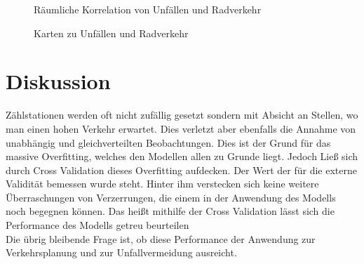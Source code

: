 \documentclass[a4paper,12pt]{thesis}
\begin{document}
\begin{figure}%
	\centering
	\qquad
	\caption{Räumliche Korrelation von Unfällen und Radverkehr}%
	\label{fig:UnfallKorrelatoon}%
\end{figure}

\begin{figure}%
	\centering
	
	\caption{Karten zu Unfällen und Radverkehr}%
	\label{fig:Unfallkarten}%
\end{figure}

\chapter{Diskussion}

Zählstationen werden oft nicht zufällig gesetzt sondern mit Absicht an Stellen, wo man einen hohen Verkehr erwartet. Dies verletzt aber ebenfalls die Annahme von unabhängig und gleichverteilten Beobachtungen. Dies ist der Grund für das massive Overfitting, welches den Modellen allen zu Grunde liegt. Jedoch Ließ sich durch Cross Validation dieses Overfitting aufdecken. Der Wert der für die externe Validität bemessen wurde steht. Hinter ihm verstecken sich keine weitere Überraschungen von Verzerrungen, die einem in der Anwendung des Modells noch begegnen können. Das heißt mithilfe der Cross Validation lässt sich die Performance des Modells getreu beurteilen\\
Die übrig bleibende Frage ist, ob diese Performance der Anwendung zur Verkehrsplanung und zur Unfallvermeidung ausreicht.
\end{document}
